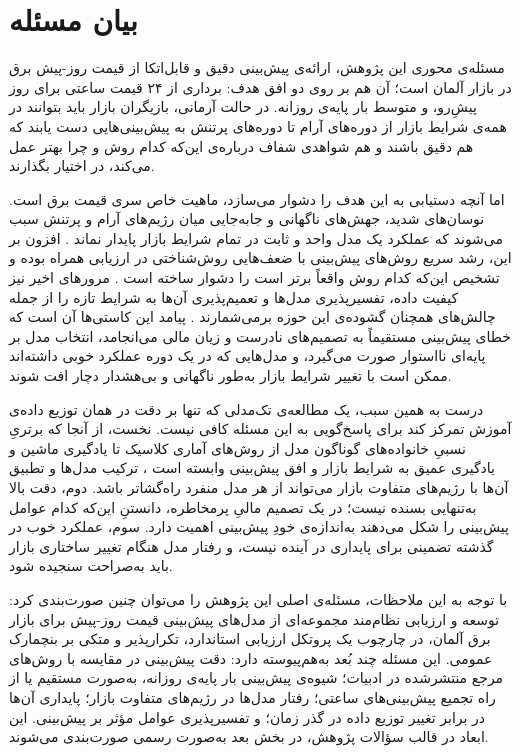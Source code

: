 
\section{بیان مسئله}

مسئله‌ی محوری این پژوهش، ارائه‌ی پیش‌بینی دقیق و قابل‌اتکا از قیمت روز-پیش برق در
بازار آلمان است؛ آن هم بر روی دو افق هدف: برداری از ۲۴ قیمت ساعتی برای روز
پیش‌ِرو، و متوسط بار پایه‌ی روزانه. در حالت آرمانی، بازیگران بازار باید بتوانند
در همه‌ی شرایط بازار  از دوره‌های آرام تا دوره‌های پرتنش  به
پیش‌بینی‌هایی دست یابند که هم دقیق باشند و هم شواهدی شفاف درباره‌ی این‌که کدام
روش و چرا بهتر عمل می‌کند، در اختیار بگذارند.

اما آنچه دستیابی به این هدف را دشوار می‌سازد، ماهیت خاص سری قیمت برق است.
نوسان‌های شدید، جهش‌های ناگهانی و جابه‌جایی میان رژیم‌های آرام و پرتنش سبب
می‌شوند که عملکرد یک مدل واحد و ثابت در تمام شرایط بازار پایدار نماند
\cite{jiang_review_2018}. افزون بر این، رشد سریع روش‌های پیش‌بینی با ضعف‌هایی
روش‌شناختی در ارزیابی همراه بوده و تشخیص این‌که کدام روش واقعاً برتر است را دشوار
ساخته است \cite{lago_forecasting_2021}. مرورهای اخیر نیز کیفیت داده،
تفسیرپذیری مدل‌ها و تعمیم‌پذیری آن‌ها به شرایط تازه را از جمله چالش‌های همچنان
گشوده‌ی این حوزه برمی‌شمارند \cite{oconnor_review_2025}. پیامد این کاستی‌ها آن
است که خطای پیش‌بینی مستقیماً به تصمیم‌های نادرست و زیان مالی می‌انجامد، انتخاب
مدل بر پایه‌ای نااستوار صورت می‌گیرد، و مدل‌هایی که در یک دوره عملکرد خوبی
داشته‌اند ممکن است با تغییر شرایط بازار به‌طور ناگهانی و بی‌هشدار دچار افت شوند.

درست به همین سبب، یک مطالعه‌ی تک‌مدلی که تنها بر دقت در همان توزیع داده‌ی آموزش
تمرکز کند برای پاسخ‌گویی به این مسئله کافی نیست. نخست، از آنجا که برتریِ نسبیِ
خانواده‌های گوناگون مدل  از روش‌های آماری کلاسیک تا یادگیری ماشین و یادگیری
عمیق  به شرایط بازار و افق پیش‌بینی وابسته است
\cite{oconnor_review_2025, jiang_review_2018}، ترکیب مدل‌ها و تطبیق آن‌ها با
رژیم‌های متفاوت بازار می‌تواند از هر مدل منفرد راه‌گشاتر باشد. دوم، دقت بالا
به‌تنهایی بسنده نیست؛ در یک تصمیم مالیِ پرمخاطره، دانستنِ این‌که کدام عوامل
پیش‌بینی را شکل می‌دهند به‌اندازه‌ی خودِ پیش‌بینی اهمیت دارد. سوم، عملکرد خوب در
گذشته تضمینی برای پایداری در آینده نیست، و رفتار مدل هنگام تغییر ساختاری بازار
باید به‌صراحت سنجیده شود.

با توجه به این ملاحظات، مسئله‌ی اصلی این پژوهش را می‌توان چنین صورت‌بندی کرد: توسعه و
ارزیابی نظام‌مند مجموعه‌ای از مدل‌های پیش‌بینی قیمت روز-پیش برای بازار برق آلمان،
در چارچوب یک پروتکل ارزیابی استاندارد، تکرارپذیر و متکی بر بنچمارک عمومی. این
مسئله چند بُعد به‌هم‌پیوسته دارد: دقت پیش‌بینی در مقایسه با روش‌های مرجع
منتشرشده در ادبیات؛ شیوه‌ی پیش‌بینی بار پایه‌ی روزانه، به‌صورت مستقیم یا از راه
تجمیع پیش‌بینی‌های ساعتی؛ رفتار مدل‌ها در رژیم‌های متفاوت بازار؛ پایداری آن‌ها در
برابر تغییر توزیع داده در گذر زمان؛ و تفسیرپذیری عوامل مؤثر بر پیش‌بینی. این ابعاد
در قالب سؤالات پژوهش، در بخش بعد به‌صورت رسمی صورت‌بندی می‌شوند.
